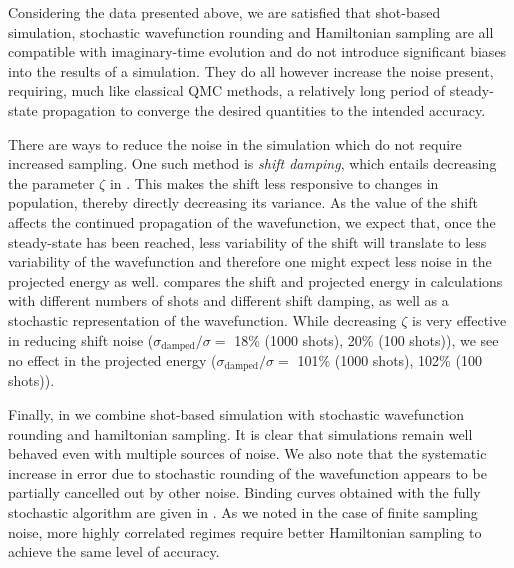 \documentclass[%
 reprint,
 amsmath,amssymb,
 aps,
]{revtex4-2}
\begin{document}
Considering the data presented above, we are satisfied that shot-based simulation, stochastic wavefunction rounding and Hamiltonian sampling are all compatible with imaginary-time evolution and do not introduce significant biases into the results of a simulation. They do all however increase the noise present, requiring, much like classical QMC methods, a relatively long period of steady-state propagation to converge the desired quantities to the intended accuracy.


There are ways to reduce the noise in the simulation which do not require increased sampling. One such method is \textit{shift damping},\cite{Booth2009} which entails decreasing the parameter $\zeta$ in . This makes the shift less responsive to changes in population, thereby directly decreasing its variance. As the value of the shift affects the continued propagation of the wavefunction, we expect that, once the steady-state has been reached, less variability of the shift will translate to less variability of the wavefunction and therefore one might expect less noise in the projected energy as well.  compares the shift and projected energy in calculations with different numbers of shots and different shift damping, as well as a stochastic representation of the wavefunction. While decreasing $\zeta$ is very effective in reducing shift noise ($\sigma_\mathrm{damped}/\sigma =$ 18\% (1000 shots), 20\% (100 shots)), we see no effect in the projected energy ($\sigma_\mathrm{damped}/\sigma =$ 101\% (1000 shots), 102\% (100 shots)).

Finally, in  we combine shot-based simulation with stochastic wavefunction rounding and hamiltonian sampling. It is clear that simulations remain well behaved even with multiple sources of noise. We also note that the systematic increase in error due to stochastic rounding of the wavefunction appears to be partially cancelled out by other noise. Binding curves obtained with the fully stochastic algorithm are given in . As we noted in the case of finite sampling noise, more highly correlated regimes require better Hamiltonian sampling to achieve the same level of accuracy.
\end{document}
